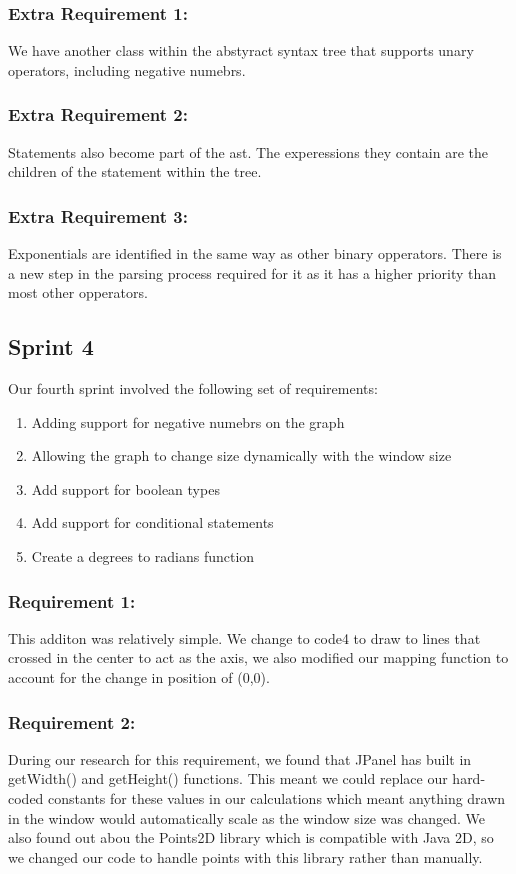 \documentclass[a4paper, oneside, 11pt]{report}
\begin{document}
\subsubsection {Extra Requirement 1: }

We have another class within the abstyract syntax tree that supports unary operators, including negative numebrs.

\subsubsection {Extra Requirement 2: }

Statements also become part of the ast. The experessions they contain are the children of the statement within the tree.

\subsubsection { Extra Requirement 3: }

Exponentials are identified in the same way as other binary opperators. There is a new step in the parsing process required for it as it has a higher priority than most other opperators.

\subsection{Sprint 4}
Our fourth sprint involved the following set of requirements:
\begin{enumerate}
\item Adding support for negative numebrs on the graph
\item Allowing the graph to change size dynamically with the window size
\item Add support for boolean types
\item Add support for conditional statements
\item Create a degrees to radians function
\end{enumerate}

\subsubsection{Requirement 1: }
This additon was relatively simple. We change to code4 to draw to lines that crossed in the center to act as the axis, we also modified our mapping function to account for  the change in position of (0,0).
\subsubsection{Requirement 2: }
During our research for this requirement, we found that JPanel has built in getWidth() and getHeight() functions. This meant we could replace our hard-coded constants for these values in our calculations which meant anything drawn in the window would automatically scale as the window size was changed.
We also found out abou the Points2D library which is compatible with Java 2D, so we changed our code to handle points with this library rather than manually.
\end{document}
